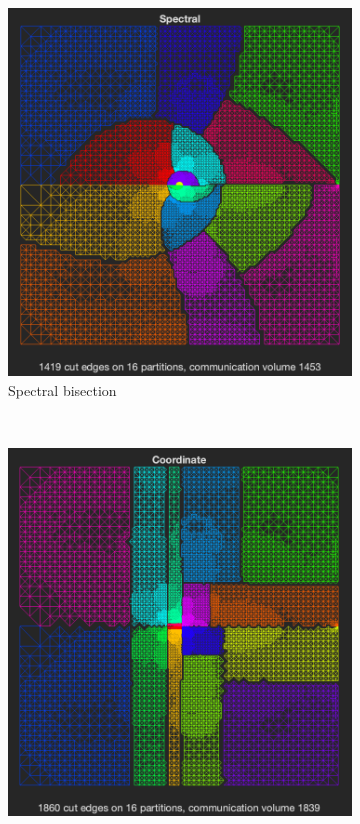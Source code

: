 \begin{figure}[H]
	\centering
	\begin{subfigure}{0.5\textwidth}
		\includegraphics[width=\textwidth]{./media/spec_crack.png}
		\caption{Spectral bisection}
		\label{fig:spec_crack}
	\end{subfigure}%
    ~
	\begin{subfigure}{0.5\textwidth}
		\includegraphics[width=\textwidth]{./media/coord_crack.png}

\end{subfigure}
\end{figure}
